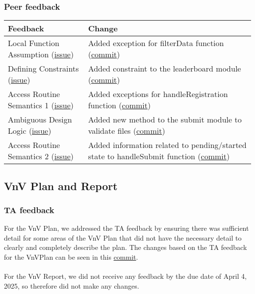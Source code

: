 \documentclass{article}
\begin{document}
\subsubsection{Peer feedback}
\begin{tabularx}{\textwidth}{X|X}
    \toprule
    \textbf{Feedback} & \textbf{Change}\\
    \midrule
    Local Function Assumption
    (\href{https://github.com/AidanMariglia/SOCAlgoTestPlatform/issues/95}{issue}) & 
    Added exception for filterData function (\href{https://github.com/AidanMariglia/SOCAlgoTestPlatform/commit/2877284dc71614806dbc69f6d295ecb31135e08d}{commit}) \\
    \midrule
    Defining Constraints
    (\href{https://github.com/AidanMariglia/SOCAlgoTestPlatform/issues/94}{issue}) & Added constraint to the leaderboard module (\href{https://github.com/AidanMariglia/SOCAlgoTestPlatform/pull/173/commits/16c6cb7f991c98e8ebbc915e939e17b30310b1ac}{commit}) \\
    \midrule
    Access Routine Semantics 1 (\href{https://github.com/AidanMariglia/SOCAlgoTestPlatform/issues/91}{issue}) & Added exceptions for handleRegistration function (\href{https://github.com/AidanMariglia/SOCAlgoTestPlatform/commit/9292fefebe491efc49891ff8ae6bb6ead1d43ca8}{commit}) \\
    \midrule
    Ambiguous Design Logic (\href{https://github.com/AidanMariglia/SOCAlgoTestPlatform/issues/92}{issue}) & Added new method to the submit module to validate files (\href{https://github.com/AidanMariglia/SOCAlgoTestPlatform/pull/173/commits/16c6cb7f991c98e8ebbc915e939e17b30310b1ac}{commit}) \\
    \midrule
    Access Routine Semantics 2 (\href{https://github.com/AidanMariglia/SOCAlgoTestPlatform/issues/93}{issue}) & 
    Added information related to pending/started state to handleSubmit function (\href{https://github.com/AidanMariglia/SOCAlgoTestPlatform/commit/c76be99d5e116b6f8c7547b98dd025331c373dd2}{commit}) \\
    \bottomrule
\end{tabularx}

\subsection{VnV Plan and Report}

\subsubsection{TA feedback}
For the VnV Plan, we addressed the TA feedback by ensuring there was sufficient detail for some areas of the VnV Plan that did not have the necessary detail to clearly and completely describe the plan. The changes based on the TA feedback for the VnVPlan can be seen in this \href{https://github.com/AidanMariglia/SOCAlgoTestPlatform/commit/4dd8cc2f49cf7ef66d83593cbfce6ae3db403463}{commit}.\\ \\
For the VnV Report, we did not receive any feedback by the due date of April 4, 2025, so therefore did not make any changes.
\end{document}
